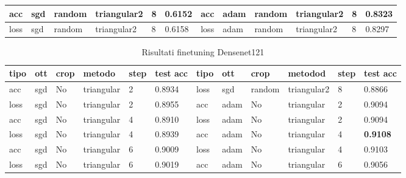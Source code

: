 \begin{table}[H]
\begin{adjustbox}{width=1\textwidth}
\begin{tabular}{|l|l|l|l|l|l||l|l|l|l|l|l|}
acc           & sgd          & random        & triangular2     & 8             & 0.6152            & acc           & adam         & random        & triangular2     & 8             & 0.8323            \\ \hline
loss          & sgd          & random        & triangular2     & 8             & 0.6158            & loss          & adam         & random        & triangular2     & 8             & 0.8297            \\ \hline
\end{tabular}
\end{adjustbox}
\label{t_res_resnet}
\end{table}

\begin{table}[H]
\centering
\caption{Risultati finetuning Densenet121}
\begin{adjustbox}{width=1\textwidth}
\begin{tabular}{|l|l|l|l|l|l||l|l|l|l|l|l|}
\hline
\textbf{tipo} & \textbf{ott} & \textbf{crop} & \textbf{metodo} & \textbf{step} & \textbf{test acc} & \textbf{tipo} & \textbf{ott} & \textbf{crop} & \textbf{metodod} & \textbf{step} & \textbf{test acc} \\ \hline
acc           & sgd          & No          & triangular       & 2             & 0.8934            & loss          & sgd          & random        & triangular2      & 8             & 0.8866            \\ \hline
loss          & sgd          & No          & triangular       & 2             & 0.8955            & acc           & adam         & No          & triangular       & 2             & 0.9094            \\ \hline
acc           & sgd          & No          & triangular       & 4             & 0.8910            & loss          & adam         & No          & triangular       & 2             & 0.9094            \\ \hline
loss          & sgd          & No          & triangular       & 4             & 0.8939            & acc           & adam         & No          & triangular       & 4             & \textbf{0.9108}   \\ \hline
acc           & sgd          & No          & triangular       & 6             & 0.9009            & loss          & adam         & No          & triangular       & 4             & 0.9103            \\ \hline
loss          & sgd          & No          & triangular       & 6             & 0.9019            & acc           & adam         & No          & triangular       & 6             & 0.9056            \\ \hline

\end{tabular}
\end{adjustbox}
\end{table}
